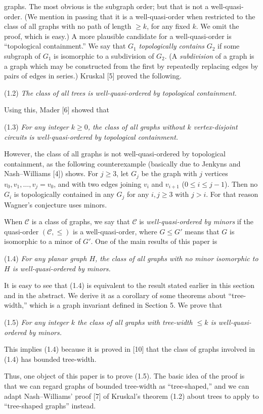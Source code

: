 \noindent graphs. The most obvious is the subgraph order; but that is not a well-quasi-order. (We mention in passing that it is a well-quasi-order when restricted to the class of all graphs with no path of length $\ge k$, for any fixed $k$. We omit the proof, which is easy.) A more plausible candidate for a well-quasi-order is ``topological containment.'' We say that $G_1$ \textit{topologically contains} $G_2$ if some subgraph of $G_1$ is isomorphic to a subdivision of $G_2$. (A \textit{subdivision} of a graph is a graph which may be constructed from the first by repeatedly replacing edges by pairs of edges in series.) Kruskal [5] proved the following.

\stmt
(1.2) \textit{The class of all trees is well-quasi-ordered by topological containment.}

Using this, Mader [6] showed that

\stmt
(1.3) \textit{For any integer $k \ge 0$, the class of all graphs without $k$ vertex-disjoint circuits is well-quasi-ordered by topological containment.}

However, the class of all graphs is not well-quasi-ordered by topological containment, as the following counterexample (basically due to Jenkyns and Nash--Williams [4]) shows. For $j \ge 3$, let $G_j$ be the graph with $j$ vertices $v_0, v_1, \dots, v_j = v_0$, and with two edges joining $v_i$ and $v_{i+1}$ ($0 \le i \le j - 1$). Then no $G_i$ is topologically contained in any $G_j$ for any $i, j \ge 3$ with $j > i$. For that reason Wagner's conjecture uses minors.

When $\mathscr{C}$ is a class of graphs, we say that $\mathscr{C}$ is \textit{well-quasi-ordered by minors} if the quasi-order $(\mathscr{C}, \le)$ is a well-quasi-order, where $G \le G'$ means that $G$ is isomorphic to a minor of $G'$. One of the main results of this paper is

\stmt
(1.4) \textit{For any planar graph $H$, the class of all graphs with no minor isomorphic to $H$ is well-quasi-ordered by minors.}

It is easy to see that (1.4) is equivalent to the result stated earlier in this section and in the abstract. We derive it as a corollary of some theorems about ``tree-width,'' which is a graph invariant defined in Section 5. We prove that

\stmt
(1.5) \textit{For any integer $k$ the class of all graphs with tree-width $\le k$ is well-quasi-ordered by minors.}

This implies (1.4) because it is proved in [10] that the class of graphs involved in (1.4) has bounded tree-width.

Thus, one object of this paper is to prove (1.5). The basic idea of the proof is that we can regard graphs of bounded tree-width as ``tree-shaped,'' and we can adapt Nash--Williams' proof [7] of Kruskal's theorem (1.2) about trees to apply to ``tree-shaped graphs'' instead.
